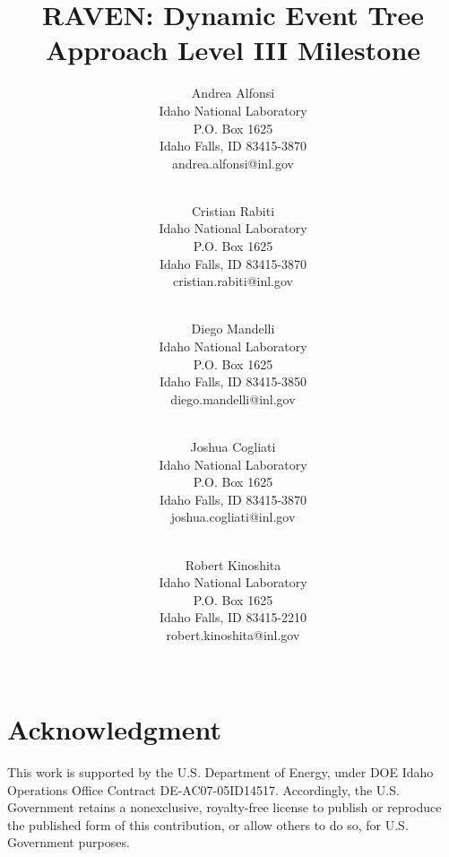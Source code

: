 \documentclass[pdf,ps2pdf,12pt]{INLreport}
\title{RAVEN: Dynamic Event Tree Approach  Level III Milestone}
\author{Andrea Alfonsi \\
	  Idaho National Laboratory\\
	  P.O. Box 1625\\
	  Idaho Falls, ID 83415-3870\\
	  andrea.alfonsi@inl.gov\\
	  \\
	  \and
         Cristian Rabiti \\
	  Idaho National Laboratory\\
	  P.O. Box 1625\\
	  Idaho Falls, ID 83415-3870\\
	  cristian.rabiti@inl.gov\\
	  \\
	  \and
         Diego Mandelli \\
	  Idaho National Laboratory\\
	  P.O. Box 1625\\
	  Idaho Falls, ID 83415-3850\\
	  diego.mandelli@inl.gov\\
	  \\
	  \and
         Joshua Cogliati \\
	  Idaho National Laboratory\\
	  P.O. Box 1625\\
	  Idaho Falls, ID 83415-3870\\
	  joshua.cogliati@inl.gov\\
	  \\
	  \and
         Robert Kinoshita \\
	  Idaho National Laboratory\\
	  P.O. Box 1625\\
	  Idaho Falls, ID 83415-2210\\
	  robert.kinoshita@inl.gov\\
	  \\
	 }
\date{}
\begin{document}
    \maketitle

%      


    \clearpage
    \section*{Acknowledgment}
	This work is supported by the U.S. Department of Energy, under DOE Idaho Operations Office Contract DE-AC07-05ID14517. Accordingly, the U.S. Government retains a nonexclusive, royalty-free license to publish or reproduce the published form of this contribution, or allow others to do so, for U.S. Government purposes.
%


    \cleardoublepage		%
    \tableofcontents
    \listoffigures


\end{document}
